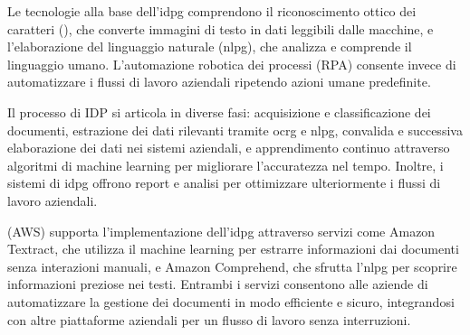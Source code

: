 Le tecnologie alla base dell'\gls{idpg} comprendono il riconoscimento ottico dei caratteri (), che converte immagini di testo in dati leggibili dalle macchine, e l'elaborazione del linguaggio naturale (\gls{nlpg}), che analizza e comprende il linguaggio umano. L'automazione robotica dei processi (RPA) consente invece di automatizzare i flussi di lavoro aziendali ripetendo azioni umane predefinite.

Il processo di IDP si articola in diverse fasi: acquisizione e classificazione dei documenti, estrazione dei dati rilevanti tramite \gls{ocrg} e \gls{nlpg}, convalida e successiva elaborazione dei dati nei sistemi aziendali, e apprendimento continuo attraverso algoritmi di machine learning per migliorare l'accuratezza nel tempo. Inoltre, i sistemi di \gls{idpg} offrono report e analisi per ottimizzare ulteriormente i flussi di lavoro aziendali.

 (AWS) supporta l'implementazione dell'\gls{idpg} attraverso servizi come Amazon Textract, che utilizza il machine learning per estrarre informazioni dai documenti senza interazioni manuali, e Amazon Comprehend, che sfrutta l'\gls{nlpg} per scoprire informazioni preziose nei testi. Entrambi i servizi consentono alle aziende di automatizzare la gestione dei documenti in modo efficiente e sicuro, integrandosi con altre piattaforme aziendali per un flusso di lavoro senza interruzioni.




%
%
%
